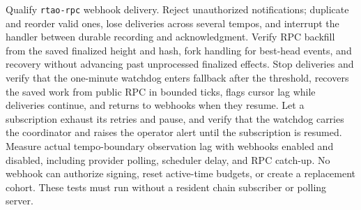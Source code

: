 Qualify \texttt{rtao-rpc} webhook delivery. Reject unauthorized
notifications; duplicate and reorder valid ones, lose deliveries across several
tempos, and interrupt the handler between durable recording and acknowledgment.
Verify RPC backfill from the saved finalized height and hash, fork handling for
best-head events, and recovery without advancing past unprocessed finalized
effects. Stop deliveries and verify that the one-minute watchdog enters
fallback after the threshold, recovers the saved work from public RPC in bounded
ticks, flags cursor lag while deliveries continue, and returns to webhooks when
they resume. Let a subscription exhaust its retries and pause, and verify that
the watchdog carries the coordinator and raises the operator alert until the
subscription is resumed. Measure actual tempo-boundary observation lag with webhooks enabled
and disabled, including provider polling, scheduler delay, and RPC catch-up. No webhook can authorize signing,
reset active-time budgets, or create a replacement cohort. These tests must run
without a resident chain subscriber or polling server.

